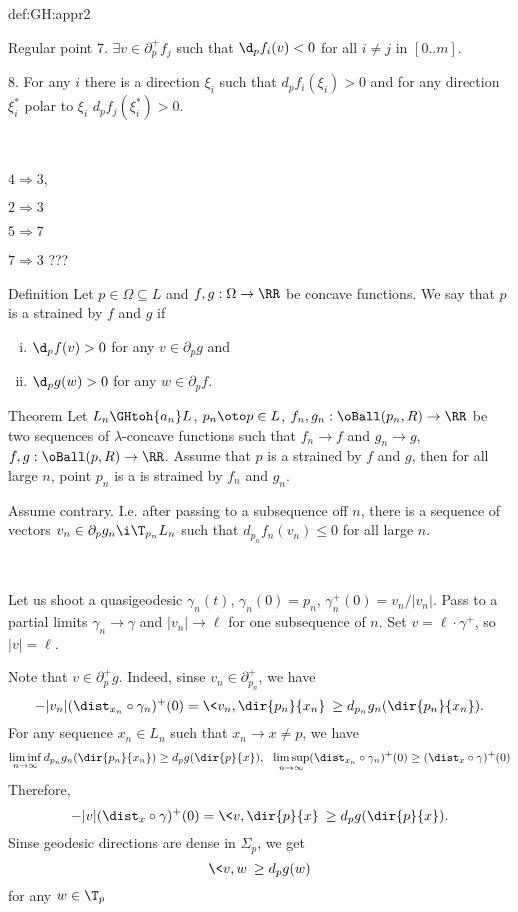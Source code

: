 {\begin{subthm}{def:GH:appr2}
\begin{thm}{Regular point}
7. $\exists v\in\partial_p^+f_j$ such that  $\d_pf_i(v)<0$ for all $i\not=j$ in $[0..m]$.

8. For any $i$ there is a direction $\xi_i$ such that $d_pf_i(\xi_i)>0$ and for any direction $\xi_i^*$ polar to $\xi_i$
$d_pf_j(\xi_i^*)>0$.

\ 

$4 \Rightarrow 3$, 

$2 \Rightarrow 3$

$5\Rightarrow 7$ 

$7\Rightarrow 3$ ???
\end{thm}

\begin{thm}{Definition}
Let $p\in\Omega \subseteq L$ and $f,g:\Omega\to\RR$ be concave functions.
We say that $p$ is a strained by $f$ and $g$ if 
\begin{enumerate}[(i)]
\item $\d_p f(v)>0$ for any $v \in\partial_p g$ and
\item $\d_p g(w)>0$ for any $w\in\partial_p f$.
\end{enumerate}
\end{thm}


\begin{thm}{Theorem}
Let $L_n\GHtoh{a_n} L$, $p_n\oto p\in L$,
$f_{n},g_n:\oBall(p_n,R)\to\RR$ be two sequences of $\lambda$-concave functions such that 
$f_{n}\to f$ and
$g_n\to g$,
$f,g: \oBall(p,R)\to \RR$.
Assume that $p$ is a strained by $f$ and $g$,
then for all large $n$, point $p_n$ is a is strained by $f_n$ and $g_n$.
\end{thm}

Assume contrary.
I.e. after passing to a subsequence off $n$, 
there is a sequence of vectors $v_n\in\partial_p g_n\i \T_{p_n}L_n$ 
such that $d_{p_n}f_n(v_n)\le 0$ for all large $n$.

\ 

Let us shoot a quasigeodesic $\gamma_n(t)$, $\gamma_n(0)=p_n$, $\gamma_n^+(0)=v_n/|v_n|$.
Pass to a partial limits $\gamma_n\to \gamma$ and $|v_n|\to \ell$ for one subsequence of $n$.
Set $v=\ell\cdot\gamma^+$, so $|v|=\ell$.

Note that $v\in\partial^+_pg$.
Indeed, sinse $v_n\in\partial^+_{p_n}$, we have 
$$-|v_n|(\dist_{x_n}\circ\gamma_n)^+(0)=\<v_n,\dir{p_n}{x_n}\>\ge d_{p_n}g_n(\dir{p_n}{x_n}).$$
For any sequence $x_n\in L_n$ such that $x_n\to x\not=p$, we have
$$\liminf_{n\to\infty} d_{p_n}g_n(\dir{p_n}{x_n})\ge d_{p}g(\dir{p}{x}),\ \  \limsup_{n\to\infty} (\dist_{x_n}\circ\gamma_n)^+(0)\ge (\dist_{x}\circ\gamma)^+(0)$$
Therefore, 
$$-|v|(\dist_{x}\circ\gamma)^+(0)=\<v,\dir{p}{x}\>\ge d_{p}g(\dir{p}{x}).$$
Sinse geodesic directions are dense in $\Sigma_p$, we get
$$\<v,w\>\ge d_{p}g(w)$$
for any $w\in \T_p$
\qeds


\end{subthm}}
